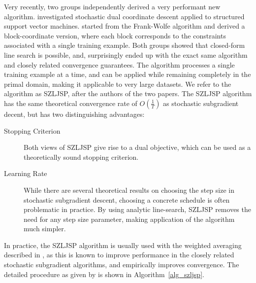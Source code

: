 Very recently, two groups independently derived a very performant new algorithm.
\citet{shalev2012proximal} investigated stochastic dual coordinate descent applied
to structured support vector machines. \citet{lacoste2012block} started from the Frank-Wolfe algorithm %
and derived a block-coordinate version, where each block corresponds to the
constraints associated with a single training example.  Both groups showed that
closed-form line search is possible, and, surprisingly ended up with the exact
same algorithm and closely related convergence guarantees.  The algorithm
processes a single training example at a time, and can be applied while
remaining completely in the primal domain, making it applicable to very large
datasets.  We refer to the algorithm as SZLJSP, after the authors of the
two papers.
%
The SZLJSP algorithm has the same theoretical convergence rate of $O(\frac{1}{T})$
as stochastic subgradient decent, but has two distinguishing advantages:
\begin{description}
\item[Stopping Criterion] Both views of SZLJSP give rise to a dual objective,
    which can be used as a theoretically sound stopping criterion.
\item[Learning Rate] While there are several theoretical results on choosing
    the step size in stochastic subgradient descent, choosing a concrete
    schedule is often problematic in practice. By using analytic line-search,
    SZLJSP removes the need for any step size parameter, making application
    of the algorithm much simpler.
\end{description}

In practice, the SZLJSP algorithm is usually used with the weighted averaging
described in , as this is known to improve performance in the
closely related stochastic subgradient algorithms, and empirically improves
convergence.
\enlargethispage{10mm}
The detailed procedure as given by \citet{lacoste2012block} is shown in Algorithm~\ref{alg_szljsp}.
